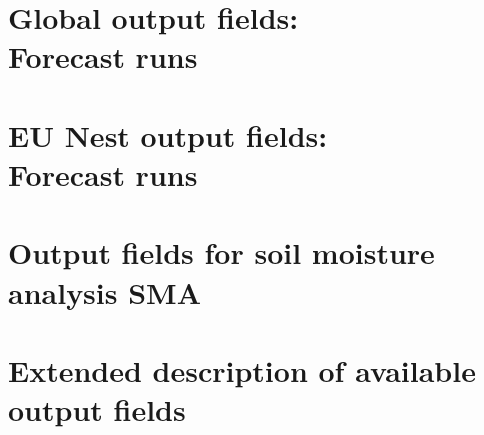 \documentclass[a4paper,twoside,10pt]{book}
\begin{document}








\chapter[Global output fields: Forecast runs]{Global output fields:\\ Forecast runs}



\chapter[EU Nest output fields: Forecast runs]{EU Nest output fields:\\ Forecast runs}
\label{nest:chap_forecast_runs}

%

\chapter{Output fields for soil moisture analysis SMA}
\label{output_for_sma}



\chapter{Extended description of available output fields}
\end{document}
